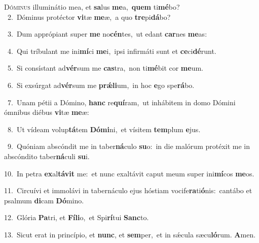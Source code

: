 \lettrine{\initial\textcolor{\initialcolor}{D}}{óminus} illuminátio mea, et \textbf{sa}\-lus \textbf{me}\-a,~\star \textbf{quem} ti\-\textbf{mé}\-bo?\\
{\numbfont\textcolor{\numbcolor}{~2.}}~Dóminus protéctor \textbf{vi}\-tæ \textbf{me}\-æ,~\star a quo \textbf{tre}\-pi\-\textbf{dá}\-bo?\par
{\numbfont\textcolor{\numbcolor}{~3.}}~Dum apprópiant super \textbf{me} no\-\textbf{cén}\-tes,~\star ut edant \textbf{car}\-nes \textbf{me}\-as:\par
{\numbfont\textcolor{\numbcolor}{~4.}}~Qui tríbulant me ini\-\textbf{mí}\-ci \textbf{me}\-i,~\star ipsi infirmáti sunt et \textbf{ce}\-ci\-\textbf{dé}\-runt.\par
{\numbfont\textcolor{\numbcolor}{~5.}}~Si consístant ad\-\textbf{vér}\-sum me \textbf{cas}\-tra,~\star non ti\-\textbf{mé}\-bit cor \textbf{me}\-um.\par
{\numbfont\textcolor{\numbcolor}{~6.}}~Si exsúrgat ad\-\textbf{vér}\-sum me \textbf{prǽ}\-\textbf{li}um,~\star in hoc \textbf{e}\-go spe\-\textbf{rá}\-bo.\par
{\numbfont\textcolor{\numbcolor}{~7.}}~Unam pétii a Dómino, \textbf{hanc} re\-\textbf{quí}\-ram,~\star ut inhábitem in domo Dómini ómnibus diébus \textbf{vi}\-tæ \textbf{me}\-æ:\par
{\numbfont\textcolor{\numbcolor}{~8.}}~Ut vídeam volup\-\textbf{tá}\-tem \textbf{Dó}\-\textbf{mi}ni,~\star et vísitem \textbf{tem}\-plum \textbf{e}\-jus.\par
{\numbfont\textcolor{\numbcolor}{~9.}}~Quóniam abscóndit me in taber\-\textbf{ná}\-culo \textbf{su}\-o:~\star in die malórum protéxit me in abscóndito taber\-\textbf{ná}\-culi \textbf{su}\-i.\par
{\numbfont\textcolor{\numbcolor}{10.}}~In petra \textbf{ex}\-al\-\textbf{tá}\-\textbf{vit} me:~\star et nunc exaltávit caput meum super ini\-\textbf{mí}\-cos \textbf{me}\-os.\par
{\numbfont\textcolor{\numbcolor}{11.}}~Circuívi et immolávi in tabernáculo ejus hóstiam vocife\-\textbf{ra}\-ti\-\textbf{ó}\-nis:~\star cantábo et psalmum \textbf{di}\-cam \textbf{Dó}\-mino.\par
{\numbfont\textcolor{\numbcolor}{12.}}~Glória \textbf{Pa}\-tri, et \textbf{Fí}\-\textbf{li}o,~\star et Spi\-\textbf{rí}\-tui \textbf{Sanc}\-to.\par
{\numbfont\textcolor{\numbcolor}{13.}}~Sicut erat in princípio, et \textbf{nunc}\-, et \textbf{sem}\-per,~\star et in sǽcula sæcu\-\textbf{ló}\-rum. \textbf{A}\-men.\par
